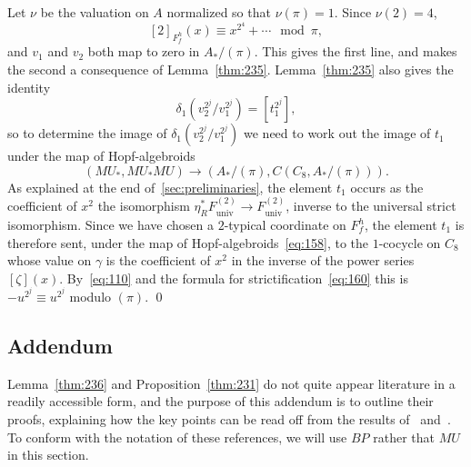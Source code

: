 \documentclass{amsart}
\theoremstyle{definition}
\theoremstyle{remark}
\newenvironment{pf}{\bigskip{\em Proof:\/}}{\qed\medskip}
\newcommand{\ze}{C_{8}}
\newcommand{\mustarmu}{MU_{\ast}MU}
\newcommand{\mustar}{MU_{\ast}}
\newcommand{\funiv}{F_{\text{univ}}}
\newcommand{\ltgroup}{F_{f}}
\begin{document}
\begin{pf}
Let $\nu$ be the valuation on $A$ normalized so that $\nu(\pi)=1$.
Since $\nu(2)=4$, 
\[
[2]_{\ltgroup^{h}}(x) \equiv x^{2^{4}} + \cdots  \mod \pi,
\]
and $v_{1}$ and $v_{2}$ both map to zero in $A_{\ast}/(\pi)$.
This gives the first line, and makes the second a consequence of
Lemma~\ref{thm:235}.   Lemma~\ref{thm:235} also gives the identity
\[
\delta_{1}(v_{2}^{2^{j}}/v_{1}^{2^{j}}) = [t_{1}^{2^{j}}],
\]
so to determine the image of $\delta_{1}(v_{2}^{2^{j}}/v_{1}^{2^{j}})$
we need to work out the image of $t_{1}$ under the map of
Hopf-algebroids
\begin{equation}
\label{eq:158}
(\mustar,\mustarmu) \to (A_{\ast}/(\pi), C(\ze,A_{\ast}/(\pi))).  
\end{equation}
As explained at the end of~\ref{sec:preliminaries}, the
element $t_{1}$ occurs as the coefficient of $x^{2}$ the isomorphism
$\eta_{R}^{\ast}\funiv^{(2)}\to \funiv^{(2)}$, inverse to the
universal strict isomorphism.  Since we have chosen a $2$-typical
coordinate on $\ltgroup^{h}$, the element $t_{1}$ is therefore sent,
under the map of Hopf-algebroids~\eqref{eq:158}, to the $1$-cocycle on
$\ze$ whose value on $\gamma$ is the coefficient of $x^{2}$ in the
inverse of the power series $[\zeta](x)$.  By~\eqref{eq:110} and the
formula for strictification~\eqref{eq:160} this is $-u^{2^{j}}\equiv
u^{2^{j}}$ modulo $(\pi)$.
\end{pf}

\subsection{Addendum} 
\label{sec:addendum} 

Lemma~\ref{thm:236} and Proposition~\ref{thm:231} do not quite appear
literature in a readily accessible form, and the purpose of this
addendum is to outline their proofs, explaining how the key points
can be read off from the results of~\cite{MRW}
and~\cite{shimomura81:_novik_rm_ext_sp2_at_prime}.  To conform with
the notation of these references, we will use $BP$ rather that $MU$ in
this section.
\end{document}
